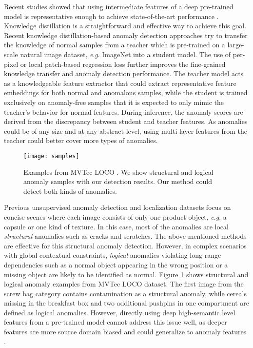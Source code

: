 \documentclass[10pt,twocolumn,letterpaper]{article}
\begin{document}
Recent studies showed that using intermediate features of a deep pre-trained model is representative enough to achieve state-of-the-art performance \cite{reiss2021panda}. Knowledge distillation \cite{hinton2015distilling} is a straightforward and effective way to achieve this goal. Recent knowledge distillation-based anomaly detection approaches \cite{bergmann2020uninformed,wang2021student,salehi2021multiresolution,deng2022anomaly,bergmann2022beyond} try to transfer the knowledge of normal samples from a teacher which is pre-trained on a large-scale natural image dataset, \textit{e}.\textit{g}. ImageNet \cite{deng2009imagenet} into a student model. The use of per-pixel \cite{wang2021student,deng2022anomaly} or local patch-based regression loss \cite{bergmann2020uninformed,bergmann2022beyond} further improves the fine-grained knowledge transfer and anomaly detection performance. The teacher model acts as a knowledgeable feature extractor that could extract representative feature embeddings for both normal and anomalous samples, while the student is trained exclusively on anomaly-free samples that it is expected to only mimic the teacher's behavior for normal features. During inference, the anomaly scores are derived from the discrepancy between student and teacher features. As anomalies could be of any size and at any abstract level, using multi-layer features from the teacher could better cover more types of anomalies.


\begin{figure}[t]
  \centering
   \texttt{[image: samples]}

   \caption{Examples from MVTec LOCO \cite{bergmann2022beyond}. We show structural and logical anomaly samples with our detection results. Our method could detect both kinds of anomalies.}
   \label{fig_examples}
\end{figure}

Previous unsupervised anomaly detection and localization datasets focus on concise scenes where each image consists of only one product object, \textit{e}.\textit{g}. a capsule or one kind of texture. In this case, most of the anomalies are local \textit{structural} anomalies such as cracks and scratches. The above-mentioned methods are effective for this structural anomaly detection. However, in complex scenarios with global contextual constraints, \textit{logical} anomalies violating long-range dependencies such as a normal object appearing in the wrong position or a missing object are likely to be identified as normal. Figure \ref{fig_examples} shows structural and logical anomaly examples from MVTec LOCO \cite{bergmann2022beyond} dataset. The first image from the screw bag category contains contamination as a structural anomaly, while cereals missing in the breakfast box and two additional pushpins in one compartment are defined as logical anomalies. However, directly using deep high-semantic level features from a pre-trained model cannot address this issue well, as deeper features are more source domain biased \cite{roth2022towards} and could generalize to anomaly features \cite{deng2022anomaly}.
\end{document}
